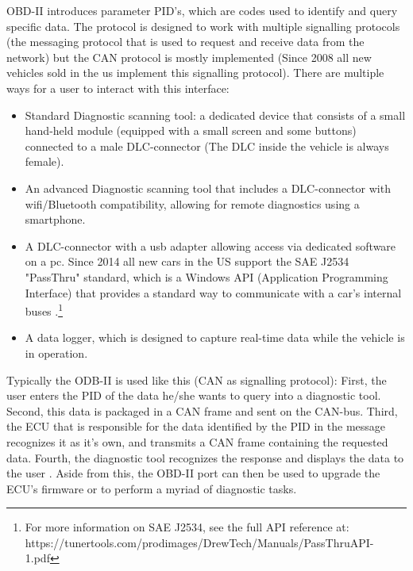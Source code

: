 OBD-II introduces parameter PID's, which are codes used to identify and query specific data. The protocol is designed to work with multiple signalling protocols (the messaging protocol that is used to request and receive data from the network) but the CAN protocol is mostly implemented (Since 2008 all new vehicles sold in the us implement this signalling protocol\cite{OBDconnector}). \newline
\newline
There are multiple ways for a user to interact with this interface:
\begin{itemize}
	\item Standard Diagnostic scanning tool: a dedicated device that consists of a small hand-held module (equipped with a small screen and some buttons) connected to a male DLC-connector (The DLC inside the vehicle is always female).
	
	\item An advanced Diagnostic scanning tool that includes a DLC-connector with wifi/Bluetooth compatibility, allowing for remote diagnostics using a smartphone.
	
	\item A DLC-connector with a usb adapter allowing access via dedicated software on a pc. Since 2014 all new cars in the US support the SAE J2534 "PassThru" standard, which is a Windows API (Application Programming Interface) that provides a standard way to communicate with a car's internal buses \cite{Kosher}.\footnote{For more information on SAE J2534, see the full API reference at: https://tunertools.com/prodimages/DrewTech/Manuals/PassThru\textunderscore API-1.pdf}
	
	\item A data logger, which is designed to capture real-time data while the vehicle is in operation.
\end{itemize}

Typically the ODB-II is used like this (CAN as signalling protocol): First, the user enters the PID of the data he/she wants to query into a diagnostic tool. Second, this data is packaged in a CAN frame and sent on the CAN-bus. Third, the ECU that is responsible for the data identified by the PID in the message recognizes it as it's own, and transmits a CAN frame containing the requested data. Fourth, the diagnostic tool recognizes the response and displays the data to the user \cite{wiki:PID}. Aside from this, the OBD-II port can then be used to upgrade the ECU's firmware or to perform a myriad of diagnostic tasks.


